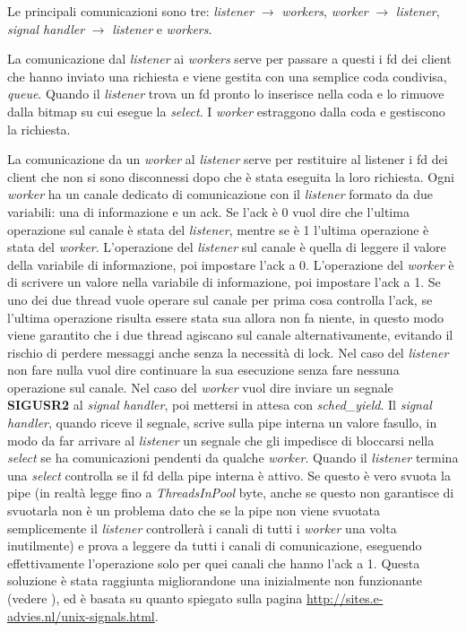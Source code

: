 \documentclass[a4paper]{article}
\theoremstyle{theorem}
\theoremstyle{remark}
\theoremstyle{definition}
\theoremstyle{corollary}
\theoremstyle{lemma}
\newcommand\codeName[1]{%
	\textit{#1}}
\begin{document}
Le principali comunicazioni sono tre: \codeName{listener} $\rightarrow$ \codeName{workers}, \codeName{worker} $\rightarrow$ \codeName{listener}, \codeName{signal handler} $\rightarrow$ \codeName{listener} e \codeName{workers}.

La comunicazione dal \codeName{listener} ai \codeName{workers} serve per passare a questi i fd dei client che hanno inviato una richiesta e viene gestita con una semplice coda condivisa, \codeName{queue}. Quando il \codeName{listener} trova un fd pronto lo inserisce nella coda e lo rimuove dalla bitmap su cui esegue la \codeName{select}. I \codeName{worker} estraggono dalla coda e gestiscono la richiesta.

La comunicazione da un \codeName{worker} al \codeName{listener} serve per restituire al listener i fd dei client che non si sono disconnessi dopo che è stata eseguita la loro richiesta. Ogni \codeName{worker} ha un canale dedicato di comunicazione con il \codeName{listener} formato da due variabili: una di informazione e un ack.
Se l'ack è 0 vuol dire che l'ultima operazione sul canale è stata del \codeName{listener}, mentre se è 1 l'ultima operazione è stata del \codeName{worker}. L'operazione del \codeName{listener} sul canale è quella di leggere il valore della variabile di informazione, poi impostare l'ack a 0. L'operazione del \codeName{worker} è di scrivere un valore nella variabile di informazione, poi impostare l'ack a 1. Se uno dei due thread vuole operare sul canale per prima cosa controlla l'ack, se l'ultima operazione risulta essere stata sua allora non fa niente, in questo modo viene garantito che i due thread agiscano sul canale alternativamente, evitando il rischio di perdere messaggi anche senza la necessità di lock.
Nel caso del \codeName{listener} non fare nulla vuol dire continuare la sua esecuzione senza fare nessuna operazione sul canale. Nel caso del \codeName{worker} vuol dire inviare un segnale \textbf{SIGUSR2} al \codeName{signal handler}, poi mettersi in attesa con \codeName{sched\_yield}. Il \codeName{signal handler}, quando riceve il segnale, scrive sulla pipe interna un valore fasullo, in modo da far arrivare al \codeName{listener} un segnale che gli impedisce di bloccarsi nella \codeName{select} se ha comunicazioni pendenti da qualche \codeName{worker}.
Quando il \codeName{listener} termina una \codeName{select} controlla se il fd della pipe interna è attivo. Se questo è vero svuota la pipe (in realtà legge fino a \codeName{ThreadsInPool} byte, anche se questo non garantisce di svuotarla non è un problema dato che se la pipe non viene svuotata semplicemente il \codeName{listener} controllerà i canali di tutti i \codeName{worker} una volta inutilmente) e prova a leggere da tutti i canali di comunicazione, eseguendo effettivamente l'operazione solo per quei canali che hanno l'ack a 1.
Questa soluzione è stata raggiunta migliorandone una inizialmente non funzionante (vedere ), ed è basata su quanto spiegato sulla pagina \url{http://sites.e-advies.nl/unix-signals.html}.
\end{document}
